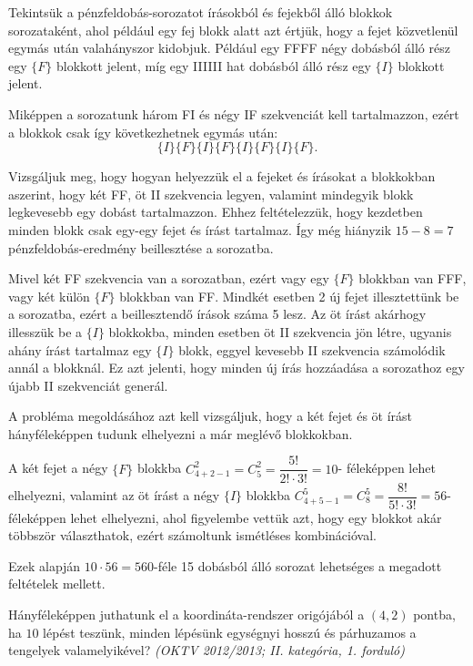 \begin{solution}
Tekintsük a pénzfeldobás-sorozatot írásokból és fejekből álló blokkok
sorozataként, ahol például egy fej blokk alatt azt értjük, hogy a
fejet közvetlenül egymás után valahányszor kidobjuk. Például egy FFFF
négy dobásból álló rész egy $\{F\}$ blokkott jelent, míg egy IIIIII
hat dobásból álló rész egy $\{I\}$ blokkott jelent.

Miképpen a sorozatunk három FI és négy IF szekvenciát kell tartalmazzon,
ezért a blokkok csak így következhetnek egymás után: 
\[
\{I\}\{F\}\{I\}\{F\}\{I\}\{F\}\{I\}\{F\}.
\]

Vizsgáljuk meg, hogy hogyan helyezzük el a fejeket és írásokat a blokkokban
aszerint, hogy két FF, öt II szekvencia legyen, valamint mindegyik
blokk legkevesebb egy dobást tartalmazzon. Ehhez feltételezzük, hogy
kezdetben minden blokk csak egy-egy fejet és írást tartalmaz. Így
még hiányzik $15-8=7$ pénzfeldobás-eredmény beillesztése a sorozatba.

Mivel két FF szekvencia van a sorozatban, ezért vagy egy $\{F\}$
blokkban van FFF, vagy két külön $\{F\}$ blokkban van FF. Mindkét
esetben 2 új fejet illesztettünk be a sorozatba, ezért a beillesztendő
írások száma 5 lesz. Az öt írást akárhogy illesszük be a $\{I\}$
blokkokba, minden esetben öt II szekvencia jön létre, ugyanis ahány
írást tartalmaz egy $\{I\}$ blokk, eggyel kevesebb II szekvencia
számolódik annál a blokknál. Ez azt jelenti, hogy minden új írás hozzáadása
a sorozathoz egy újabb II szekvenciát generál.

A probléma megoldásához azt kell vizsgáljuk, hogy a két fejet és öt
írást hányféleképpen tudunk elhelyezni a már meglévő blokkokban.

A két fejet a négy $\{F\}$ blokkba $C_{4+2-1}^{2}=C_{5}^{2}=\dfrac{5!}{2!\cdot3!}=10$-
féleképpen lehet elhelyezni, valamint az öt írást a négy $\{I\}$
blokkba $C_{4+5-1}^{5}=C_{8}^{5}=\dfrac{8!}{5!\cdot3!}=56$-féleképpen
lehet elhelyezni, ahol figyelembe vettük azt, hogy egy blokkot akár
többször választhatok, ezért számoltunk ismétléses kombinációval.

Ezek alapján $10\cdot56=560$-féle 15 dobásból álló sorozat lehetséges
a megadott feltételek mellett. 
\end{solution}
\begin{extraproblem}
Hányféleképpen juthatunk el a koordináta-rendszer origójából a $(4,2)$
pontba, ha $10$ lépést teszünk, minden lépésünk egységnyi hosszú
és párhuzamos a tengelyek valamelyikével? \emph{(OKTV 2012/2013; II.
kategória, 1. forduló)}
\end{extraproblem}

